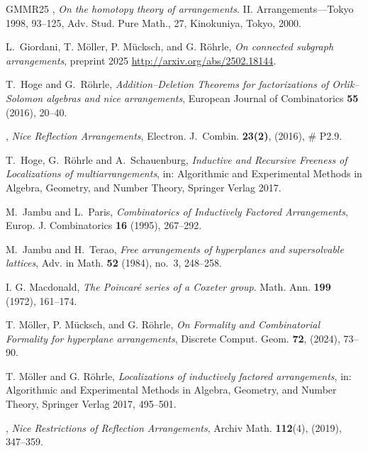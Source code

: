 \documentclass[12pt]{amsart}
\numberwithin{equation}{section}
\theoremstyle{plain}
\theoremstyle{definition}
\begin{document}
\begin{thebibliography}{GMMR25}
\bysame,
\emph{On the homotopy theory of arrangements}. II. Arrangements—Tokyo 1998, 93--125, Adv. Stud. Pure Math., 27, Kinokuniya, Tokyo, 2000.

L.~Giordani, T. M\"oller, P. M\"ucksch, and G. R\"ohrle,
\emph{On connected subgraph arrangements}, preprint 2025 \url{http://arxiv.org/abs/2502.18144}.

T.~Hoge and G.~R\"ohrle,
\emph{Addition–Deletion Theorems for factorizations
	of Orlik–Solomon algebras and nice
	arrangements},
European Journal of Combinatorics
\textbf{55} (2016), 20--40.

\bysame, %
\emph{Nice Reflection Arrangements},
Electron. J.~Combin. 
\textbf{23(2)}, (2016), \# P2.9. 

	T.~Hoge, G.~R\"ohrle and A.~Schauenburg, 
	\emph{Inductive and Recursive Freeness of Localizations of 
		multiarrangements}, 
	in: Algorithmic and Experimental Methods in Algebra, Geometry, and Number Theory, Springer Verlag
	2017.

M.~Jambu and L.~Paris,
\emph{Combinatorics of Inductively Factored Arrangements},
Europ. J. Combinatorics \textbf{16} (1995), 267--292.

M.~Jambu and H.~Terao, 
\emph{Free arrangements of hyperplanes and 
	supersolvable lattices},
Adv. in Math. \textbf{52} (1984), no.~3, 248--258. 


I. G.  Macdonald, 
\emph{The Poincar\'e series of a Coxeter group}. 
Math. Ann. \textbf{199} (1972), 161--174. 


T. M\"oller, P. M\"ucksch, and G. R\"ohrle,
 \emph{On Formality and Combinatorial Formality for hyperplane arrangements},
 Discrete Comput. Geom. \textbf{72}, (2024), 73--90.
 
 T. M\"oller and G. R\"ohrle,
 \emph{Localizations of inductively factored arrangements}, 
 in: Algorithmic and Experimental Methods in Algebra, Geometry, and Number Theory, Springer Verlag
 2017, 495--501.

\bysame, %
\emph{Nice Restrictions of Reflection Arrangements},
Archiv Math. \textbf{112}(4), (2019), 347--359.



\end{thebibliography}
\end{document}
